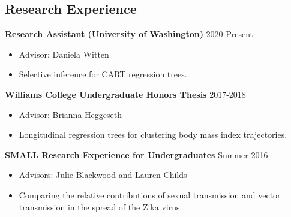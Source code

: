 \documentclass[margin, 10pt]{res} %
\begin{document}
\begin{resume}
 
\section{Research Experience}

{\textbf{Research Assistant (University of Washington)} \hfill 2020-Present
\begin{itemize}
\item Advisor: Daniela Witten
\item Selective inference for CART regression trees. 
\end{itemize} 

{\textbf{Williams College Undergraduate Honors Thesis}} \hfill 2017-2018 
\begin{itemize}
\item Advisor: Brianna Heggeseth
\item Longitudinal regression trees for clustering body mass index trajectories.
\end{itemize} 

{\textbf{SMALL Research Experience for Undergraduates}} \hfill Summer 2016 
\begin{itemize}
\item Advisors: Julie Blackwood and Lauren Childs
\item Comparing the relative contributions of sexual transmission and vector transmission in the spread of the Zika virus.
\end{itemize} 


}
\end{resume}
\end{document}
